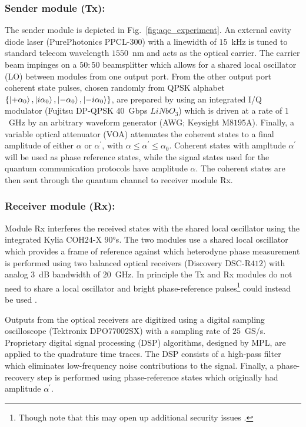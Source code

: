\subsubsection{Sender module (Tx):} The sender module is depicted in Fig.~\ref{fig:aqc_experiment}. An external cavity diode laser (PurePhotonics PPCL-$300$) with a linewidth of $15$~kHz is tuned to standard telecom wavelength $1550$~nm and acts as the optical carrier. The carrier beam impinges on a $50:50$ beamsplitter which allows for a shared local oscillator (LO) between modules from one output port. From the other output port  coherent state pulses, chosen randomly from QPSK alphabet $\left\{ \ket{+ \alpha_0}, \ket{i \alpha_0}, \ket{-\alpha_0}, \ket{-i \alpha_0}\right\}$, are prepared by using an integrated I/Q modulator (Fujitsu DP-QPSK $40$~Gbps $LiNbO_3$) which is driven at a rate of $1$~GHz by an arbitrary waveform generator (AWG; Keysight M$8195$A). Finally, a variable optical attenuator (VOA) attenuates the coherent states to a final amplitude of either $\alpha$ or $\alpha^\prime$, with $\alpha \le \alpha^\prime \le \alpha_0$. Coherent states with ampltude $\alpha^\prime$ will be used as phase reference states, while the signal states used for the quantum communication protocols have amplitude $\alpha$. The coherent states are then sent through the quantum channel to receiver module Rx.

\subsubsection{Receiver module (Rx):}
Module Rx interferes the received states with the shared local oscillator using the integrated Kylia COH$24$-X $90\si{\degree}$s. The two modules use a shared local oscillator which provides a frame of reference against which heterodyne phase measurement is performed using two balanced optical receivers (Discovery DSC-R$412$) with analog $3$~dB bandwidth of $20$~GHz. In principle the Tx and Rx modules do not need to share a local oscillator and bright phase-reference pulses\footnote{Though note that this may open up additional security issues \cite{Ren2019}.} could instead be used \cite{Huang2015}.

Outputs from the optical receivers are digitized using a digital sampling oscilloscope (Tektronix DPO$77002$SX) with a sampling rate of $25$~GS/s. Proprietary digital signal processing (DSP) algorithms, designed by MPL, are applied to the quadrature time traces. The DSP consists of a high-pass filter which eliminates low-frequency noise contributions to the signal. Finally, a phase-recovery step is performed using phase-reference states which originally had amplitude $\alpha^\prime$. %

